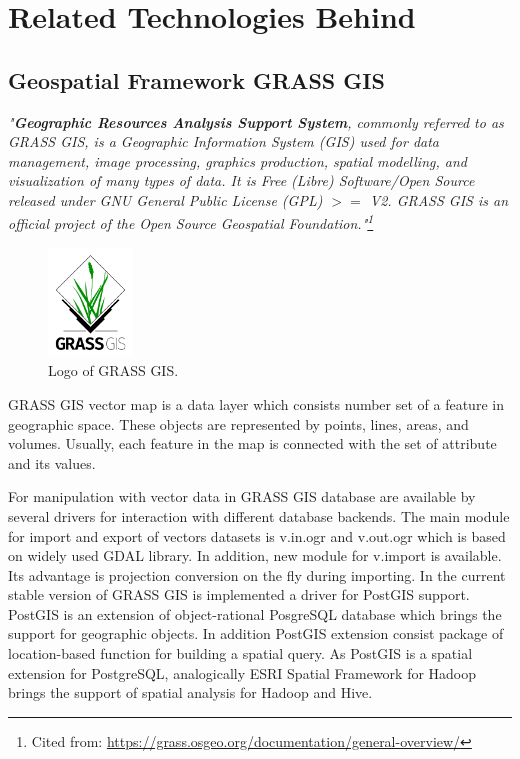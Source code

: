 \documentclass[a4paper,12pt,oneside]{report}
\begin{document}
	
	\section{Related Technologies Behind}
	\subsection{Geospatial Framework GRASS GIS}
	
	\textit{"\textbf{Geographic Resources Analysis Support System}, 
		commonly referred to as GRASS GIS, is a Geographic Information System (GIS) used
		for data management, image processing, graphics production, 
		spatial modelling, and visualization of many types of data. It is Free (Libre)
		Software/Open Source released under GNU General Public License 
		(GPL) $>=$ V2. GRASS GIS is an official project of the Open Source Geospatial
		Foundation."\footnote{Cited from:
			\url{https://grass.osgeo.org/documentation/general-overview/}}}
	
	\begin{figure}[!htbp]
		\centering
		\includegraphics[width=0.2\textwidth]{./img/grasslogo.png}
		\caption[Logo GRASS]{\centering Logo of GRASS GIS.}
	\end{figure}   
	GRASS GIS vector map is a data layer which consists number set of a feature in
	geographic space. These objects are represented by points, lines, areas, and volumes. Usually,
	each feature in the map is  connected with the set of attribute and its values.
	
	For manipulation with vector data in GRASS GIS database are available by several drivers for interaction with different database backends. The main module for import and export of vectors datasets is
	v.in.ogr and v.out.ogr which is based on widely used GDAL library. In addition, new module for v.import is available. Its advantage is projection conversion on the fly during importing.
	In the current stable version of GRASS GIS is implemented a driver for PostGIS
	support. PostGIS is an extension of object-rational PosgreSQL database which brings the support for
	geographic objects. In addition PostGIS extension consist package of 
	location-based function for building a spatial query.  
	As PostGIS is a spatial extension for PostgreSQL, analogically ESRI Spatial
	Framework for Hadoop brings the support of spatial analysis for Hadoop and  Hive.
	
\end{document}
